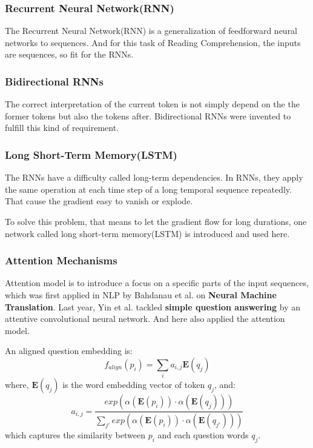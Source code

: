 \documentclass[12pt]{article}
\numberwithin{equation}{section}
\begin{document}
\subsubsection{Recurrent Neural Network(RNN)}
	The Recurrent Neural Network(RNN)\citep{Goodfellow-et-al-2016-Book} is a generalization of feedforward neural networks to sequences. And for this task of Reading Comprehension, the inputs are sequences, so fit for the RNNs. \par
\subsubsection{Bidirectional RNNs}
	The correct interpretation of the current token is not simply depend on the the former tokens but also the tokens after. Bidirectional RNNs were invented to fulfill this kind of requirement\citep{Goodfellow-et-al-2016-Book}. \par
\subsubsection{Long Short-Term Memory(LSTM)}
	The RNNs have a difficulty called long-term dependencies. In RNNs, they apply the same operation at each time step of a long temporal sequence repeatedly. That cause the gradient easy to vanish or explode. \par
	To solve this problem, that means to let the gradient flow for long durations, one network called long short-term memory(LSTM) is introduced\citep{hochreiter1997long} and used here.
\subsubsection{Attention Mechanisms}
	Attention model is to introduce a focus on a specific parts of the input sequences, which was first applied in NLP by Bahdanau et al.\citep{bahdanau2014neural} on \textbf{Neural Machine Translation}. Last year, Yin et al.\citep{yin2016simple} tackled \textbf{simple question answering} by an attentive convolutional neural network. And here also applied the attention model.\par
	An aligned question embedding is:
	\begin{equation}
		f_{align}(p_i)=\sum_i a_{i,j}\bm{E}(q_j)
	\end{equation}
where, $\bm{E}(q_j)$ is the word embedding vector of token $q_j$, and:
	\begin{equation}
		a_{i,j}=\frac{exp(\alpha(\bm{E}(p_i))\cdot\alpha(\bm{E}(q_j)))}{\sum_{j'}exp(\alpha(\bm{E}(p_i))\cdot\alpha(\bm{E}(q_{j'})))}
	\end{equation}
which captures the similarity between $p_i$ and each question words $q_j$. \par
\end{document}
